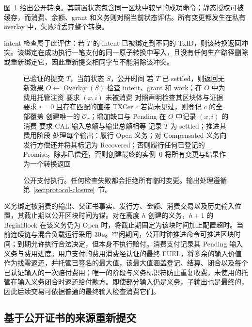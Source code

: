 图~\ref{fig:protocol-payment} 给出公开转换。其前置状态包含同一区块中较早的成功命令；静态授权可被缓存，而消费、余额、grant 和义务则对照当前状态评估。所有变更都发生在私有 overlay 中，失败将丢弃整个转换。

intent 检查属于此评估：若 $T$ 的 intent 已被绑定到不同的 TxID，则该转换返回冲突。该绑定在成功执行一笔支付的同一原子转换中写入，且没有任何生产路径删除或重新绑定它，因此重新提交相同字节不能消除该冲突。

\begin{figure}[t]
  \small
  \begin{algorithmic}[1]
    \REQUIRE 已验证的提交 $T$，当前状态 $S$，公开时间
    \STATE 若 $T$ 已 settled，则返回无新效果
    \STATE $O\gets\operatorname{Overlay}(S)$
    \STATE 检查 intent、grant 和 work；在 $O$ 中为费用托管注资
      \STATE 要求 $(x,i)$ 未被消费
        \STATE 对照声明检查其区块体与证据
      \ELSE
        \STATE 要求 $i=0$ 且存在匹配的直接 TXCer $c$
        \STATE 若尚未见过，则登记 $c$ 的全部覆盖
        \STATE 创建唯一的 $\mathcal{O}_x$；增加缺口与 Pending
      \ENDIF
      \STATE 在 $O$ 中记录 $(x,i)$ 的消费
    \ENDFOR
    \STATE 要求 CAL 输入总额与输出总额相等
    \STATE 记录 $T$ 为 settled；推进其费用阶段
    \STATE 处理每个输出：履行 Open 义务；对 Compensated 义务向发行方偿还并将其标记为 Recovered；否则履行任何已登记的 Promise。除非已偿还，否则创建最终的实例~0
    \STATE 将所有变更与结果作为一个转换返回
  \end{algorithmic}
  \caption{公开支付执行。任何检查失败都会拒绝所有临时变更。输出处理遵循第~\ref{sec:protocol-closure}~节。}
  \label{fig:protocol-payment}
\end{figure}

义务绑定被消费的输出、父证书事实、发行方、金额、消费交易以及历史输入位置，其截止期以公开区块时间为锚。对在高度 $h$ 创建的义务，$h+1$ 的 BeginBlock 在该义务仍为 Open 时，将截止期固定为该块时间加上配置超时。当前连续链与混合负载运行采用 30\,s。空闲期间，公开时钟推进命令可推进区块时间；到期允许执行合法决定，但本身不执行赔付。消费支付记录其 Pending 输入义务与费用进度。用户支付的费用消费经认证的最终 FUEL，将多余的输入价值作为找零返还，并托管已签名的最大值，该最大值涵盖登记、结算、闭合以及每个已认证输入的一次赔付费用；唯一的阶段与义务标识符防止重复收费，未使用的托管在输入义务闭合时返还给付款方。即使部分输入仍是义务，子输出也是最终的，因此后续交易可依据普通的最终输入检查消费它们。
\subsection{基于公开证书的来源重新提交}
\label{sec:protocol-resubmission}


